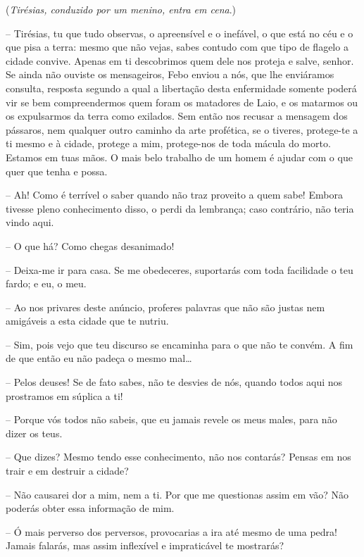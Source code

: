 (\emph{Tirésias, conduzido por um menino, entra em cena}.)

 --    Tirésias, tu que tudo observas, o apreensível e o inefável, o que
está no céu e o que pisa a terra: mesmo que não vejas, sabes contudo com
que tipo de flagelo a cidade convive. Apenas em ti descobrimos quem dele
nos proteja e salve, senhor. Se ainda não ouviste os mensageiros, Febo
enviou a nós, que lhe enviáramos consulta, resposta segundo a qual a
libertação desta enfermidade somente poderá vir se bem compreendermos
quem foram os matadores de Laio, e os matarmos ou os expulsarmos 
da terra como exilados. Sem então nos recusar a mensagem dos pássaros,
nem qualquer outro caminho da arte profética, se o tiveres, protege-te a
ti mesmo e à cidade, protege a mim, protege-nos de toda mácula do morto.
Estamos em tuas mãos. O mais belo trabalho de um homem é ajudar com o
que quer que tenha e possa.

 --   Ah! Como é terrível o saber quando não traz proveito a quem sabe! Embora
tivesse pleno conhecimento disso, o perdi da lembrança; caso contrário,
não teria vindo aqui.

 --   O que há? Como chegas desanimado!

 --    Deixa-me ir para casa. Se me obedeceres, suportarás com toda
facilidade o teu fardo; e eu, o meu.

 --   Ao nos privares deste anúncio, proferes palavras que não são justas nem
amigáveis a esta cidade que te nutriu.

 --   Sim, pois vejo que teu discurso se encaminha para o que não te convém. A
fim de que então eu não padeça o mesmo mal\ldots{}

 --   Pelos deuses! Se de fato sabes, não te desvies de nós, quando todos aqui
nos prostramos em súplica a ti!

 --   Porque vós todos não sabeis, que eu jamais revele os meus males, para
não dizer os teus.

 --    Que dizes? Mesmo tendo esse conhecimento, não nos contarás? Pensas
em nos trair e em destruir a cidade?

 --   Não causarei dor a mim, nem a ti. Por que me questionas assim em vão?
Não poderás obter essa informação de mim.

 --   Ó mais perverso dos perversos, provocarias a ira até mesmo de uma pedra!
Jamais falarás, mas assim inflexível e impraticável te mostrarás?

